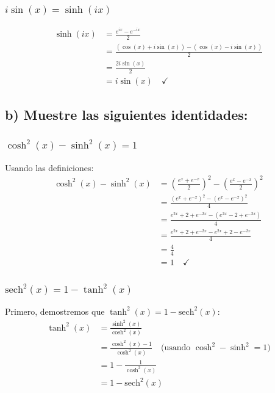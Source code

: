 \documentclass{article}
\begin{document}
\subsubsection*{$i\sin(x) = \sinh(ix)$}

\begin{align*}
\sinh(ix) &= \frac{e^{ix} - e^{-ix}}{2} \\
          &= \frac{(\cos(x) + i\sin(x)) - (\cos(x) - i\sin(x))}{2} \\
          &= \frac{2i\sin(x)}{2} \\
          &= i\sin(x) \quad \checkmark
\end{align*}

\subsection*{b) Muestre las siguientes identidades:}

\subsubsection*{$\cosh^2(x) - \sinh^2(x) = 1$}

Usando las definiciones:
\begin{align*}
\cosh^2(x) - \sinh^2(x) &= \left(\frac{e^x + e^{-x}}{2}\right)^2 - \left(\frac{e^x - e^{-x}}{2}\right)^2 \\
                        &= \frac{(e^x + e^{-x})^2 - (e^x - e^{-x})^2}{4} \\
                        &= \frac{e^{2x} + 2 + e^{-2x} - (e^{2x} - 2 + e^{-2x})}{4} \\
                        &= \frac{e^{2x} + 2 + e^{-2x} - e^{2x} + 2 - e^{-2x}}{4} \\
                        &= \frac{4}{4} \\
                        &= 1 \quad \checkmark
\end{align*}

\subsubsection*{$\text{sech}^2(x) = 1 - \tanh^2(x)$}

Primero, demostremos que $\tanh^2(x) = 1 - \text{sech}^2(x)$:
\begin{align*}
\tanh^2(x) &= \frac{\sinh^2(x)}{\cosh^2(x)} \\
           &= \frac{\cosh^2(x) - 1}{\cosh^2(x)} \quad \text{(usando } \cosh^2 - \sinh^2 = 1\text{)} \\
           &= 1 - \frac{1}{\cosh^2(x)} \\
           &= 1 - \text{sech}^2(x)
\end{align*}
\end{document}
